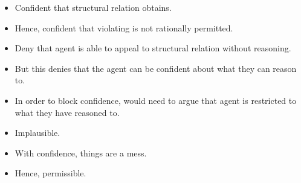 \documentclass[10pt]{article}
\begin{document}
\begin{itemize}
\item Confident that structural relation obtains.
\item Hence, confident that violating is not rationally permitted.
\item Deny that agent is able to appeal to structural relation without reasoning.
\item But this denies that the agent can be confident about what they can reason to.
\item In order to block confidence, would need to argue that agent is restricted to what they have reasoned to.
\item Implausible.
\item With confidence, things are a mess.
\item Hence, permissible.
\end{itemize}
\end{document}
